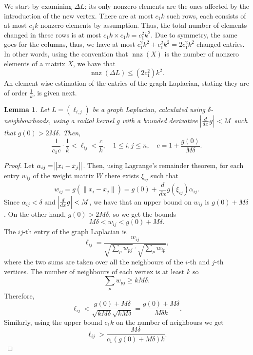 \documentclass[11pt]{article}
\newtheorem{lemma}[theorem]{Lemma}
\begin{document}
We start by examining $\Delta L$; its only nonzero elements are the ones affected by the introduction of the new vertex. There are at most $c_1k$ such rows, each consists of at most $c_1k$ nonzero elements by assumption. Thus, the total number of elements changed in these rows is at most $c_1k \times c_1k = c_1^2k^2$. Due to symmetry, the same goes for the columns, thus, we have at most $c_1^2k^2 + c_1^2k^2 = 2c_1^2k^2$ changed entries. In other words, using the convention that $\operatorname{nnz}(X)$ is the number of nonzero elements of a matrix $X$, we have that 
\begin{equation} \label{eqn:boundnnz}
  \operatorname{nnz}(\Delta L) \leq (2c_1^2)k^2  . 
\end{equation}
An element-wise estimation of the entries of the graph Laplacian, stating they are of order $\frac{1}{k}$, is given next.
\begin{lemma} \label{lemma:bounding_elementwise}  
Let $L =(\ell_{i,j})$ be a graph Laplacian, calculated using $\delta$-neighbourhoods, using a radial kernel $g$ with a bounded derivative $\abs{\frac{d}{dx}g} < M$ such that $g(0) > 2M\delta$. Then, 
\begin{equation}
 \frac{1}{c_1c} \cdot \frac{1}{k} < \ell_{ij} < \frac{c}{k}  , \quad 1\le i,j \le n , \quad c = 1+ \frac{g(0)}{M\delta}. 
\end{equation}
\end{lemma}
\begin{proof}
Let $\alpha_{ij} = \norm{x_i - x_j}$. Then, using Lagrange's remainder theorem, for each entry $w_{ij}$ of the weight matrix $W$ there exists $\xi_{ij}$ such that
\begin{equation} \label{eq:wij}
w_{ij} = g(\|x_i - x_j\|) =  g(0) + \frac{d}{dx}g(\xi_{ij})\alpha_{ij} . 
\end{equation}
Since $\alpha_{ij} < \delta$ and $\abs{\frac{d}{dx}g} < M$, we have that an upper bound on $w_{ij}$ is $g(0) + M\delta$. On the other hand, $g(0) > 2M\delta$, so we get the bounds
\begin{equation} \label{eq:w_bounds}
M\delta < w_{ij} < g(0) + M\delta.
\end{equation}
The $ij$-th entry of the graph Laplacian is
\begin{equation} \label{eq:gl_entry}
\ell_{ij} = \frac{w_{ij}}{\sqrt{\sum_p w_{pj}} \cdot \sqrt{\sum_p w_{ip}}} , 
\end{equation}
where the two sums are taken over all the neighbours of the $i$-th and $j$-th vertices. 
\noindent
The number of neighbours of each vertex is at least $k$ so 
\begin{equation} \label{eq:sum_gl}
\sum_p w_{pj} \ge k M \delta  .
\end{equation}
Therefore,
\begin{equation}
\ell_{ij} < \frac{g(0) + M\delta}{\sqrt{kM\delta}\sqrt{kM\delta}} = \frac{g(0) + M\delta}{M\delta k} .
\end{equation}
Similarly, using the upper bound  $c_1 k$ on the number of neighbours we get
\begin{equation}
\ell_{ij} > \frac{M\delta}{c_1(g(0) + M\delta)k} .
\end{equation}
\end{proof}
\end{document}
